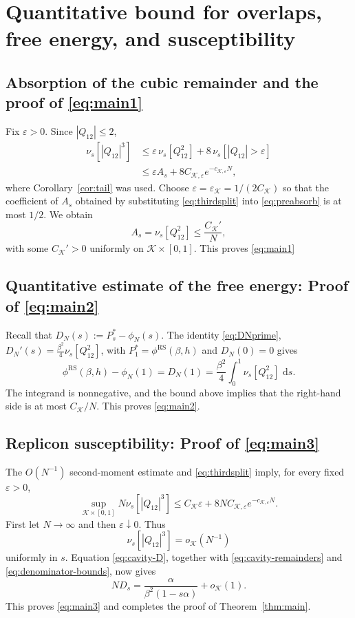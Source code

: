 \documentclass[11pt]{article}
\numberwithin{equation}{section}
\newcommand{\1}{\mathbf 1}
\newcommand{\cK}{\mathcal K}
\newcommand{\dd}{\,\mathrm d}
\begin{document}
\section{Quantitative bound for overlaps, free energy, and susceptibility}\label{sec:conclusion}

\subsection{Absorption of the cubic remainder and the proof of \eqref{eq:main1}}\label{subsec:absorb}

Fix $\varepsilon>0$.  Since $|Q_{12}|\le2$,
\begin{align}
 \nu_s[|Q_{12}|^3]
 &\le
 \varepsilon\,\nu_s[Q_{12}^2]
 +8\,\nu_s[|Q_{12}|>\varepsilon]\nonumber\\
 &\le
 \varepsilon A_s
 +8C_{\cK,\varepsilon}e^{-c_{\cK,\varepsilon}N},
 \label{eq:thirdsplit}
\end{align}
where Corollary~\ref{cor:tail} was used.  Choose
$\varepsilon=\varepsilon_{\cK}=1/(2C_\cK)$
so that the coefficient of $A_s$ obtained by substituting
\eqref{eq:thirdsplit} into \eqref{eq:preabsorb} is at most $1/2$.
We obtain
\[
 A_s=\nu_s[Q_{12}^2] \le\frac{C_{\cK}'}N,
\]
with some $C_\cK'>0$ uniformly on $\cK\times[0,1]$.  This proves \eqref{eq:main1}

\subsection{Quantitative estimate of the free energy: Proof of \eqref{eq:main2}}\label{subsec:freeenergy}

Recall that $D_N(s):= P_s^* -\phi_N(s)$. The identity \eqref{eq:DNprime}, $D_N'(s) = \frac{\beta^2}{4}\nu_s[Q_{12}^2]$, with $P_1^*  =  \phi^{\mathrm{RS}}(\beta,h)$ and  $D_N(0)=0$ gives
\begin{equation}
 \phi^{\mathrm{RS}}(\beta,h)-\phi_N(1)
 =D_N(1)=
 \frac{\beta^2}{4}\int_0^1\nu_s[Q_{12}^2]\,\dd s.
 \label{eq:freeenergyidentity}
\end{equation}
The integrand is nonnegative, and the  bound above implies that the right-hand side is at most $C_{\cK}/N$.  This proves \eqref{eq:main2}.

\subsection{Replicon susceptibility: Proof of \eqref{eq:main3}}\label{subsec:susceptibility}

The $O(N^{-1})$ second-moment estimate and
\eqref{eq:thirdsplit} imply, for every fixed $\varepsilon>0$,
\[
 \sup_{\cK\times[0,1]}
 N\nu_s[|Q_{12}|^3]
 \le C_{\cK}\varepsilon
 +8N C_{\cK,\varepsilon}e^{-c_{\cK,\varepsilon}N}.
\]
First let $N\to\infty$ and then $\varepsilon\downarrow0$.  Thus
\[
 \nu_s[|Q_{12}|^3]=o_{\cK}(N^{-1})
\]
uniformly in $s$.  Equation \eqref{eq:cavity-D}, together with
\eqref{eq:cavity-remainders} and \eqref{eq:denominator-bounds}, now gives
\[
 ND_s
 =
 \frac{\alpha}{\beta^2(1-s\alpha)}+o_{\cK}(1).
\]
This proves \eqref{eq:main3} and completes the proof of
Theorem~\ref{thm:main}.
\end{document}
